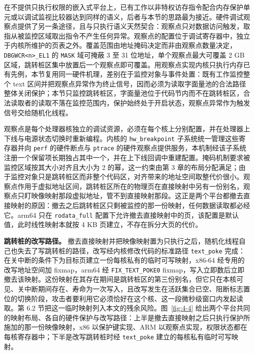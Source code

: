 在不提供只执行权限的嵌入式平台上，已有工作以非特权访存指令配合内存保护单元\citep{kwon2019uxom}或以调试监视比较器\citep{shen2020picoxom}达到同样的语义，后者与本节的思路最为接近。硬件调试观察点提供了另一条途径，且与只执行语义天然契合：观察点只对数据访问触发，取指从被监控区域取出指令不产生任何异常。观察点的配置位于调试寄存器中，独立于内核所维护的页表之外。覆盖范围由地址掩码决定而非由观察点数量决定，\lstinline[breaklines=false]@DBGWCR<n>_EL1@ 的 \lstinline[breaklines=false]@MASK@ 域可掩蔽 3 至 31 位地址，单个观察点最大可覆盖 2 GB 区域，跳转桩区集中放置后一个观察点即可覆盖。用观察点实现内核只执行内存已有先例\citep{jang2019revisiting}，本节复用同一硬件机理，差别在于监控对象与事件处置：既有工作监控整个 text 区间并把观察点异常作为终止信号，因而必须为读取字面量池的合法路径整体关闭保护；本节只监控跳转桩区，字面量池位于代码节内而不在跳转桩区，合法读取者的读取不落在监控范围内，保护始终处于开启状态，观察点异常作为触发信号交给随机化线程。

观察点是每个处理器核独立的调试资源，必须在每个核上分别配置，并在处理器上下线与电源状态切换时重新编程。内核的 \lstinline[breaklines=false]@hw_breakpoint@ 子系统统一管理这些寄存器并向 \lstinline[breaklines=false]@perf@ 的硬件断点与 \lstinline[breaklines=false]@ptrace@ 的硬件观察点提供服务，本机制经该子系统注册一个保留项长期独占其中一个，并在上下线回调中重建配置。掩码机制要求被监控区域按其大小对齐且大小为 2 的幂，这一约束由第 3 章的布局分配满足；由于监控对象只是跳转桩区而非整个代码区，对齐带来的地址空间取整代价很小。观察点作用于虚拟地址区间，跳转桩区所在的物理页在直接映射中另有一份别名，观察点只盯映像映射那段虚拟地址，管不到直接映射那段。这正是两个平台都撤去直接映射的原因：撤去之后跳转桩区只剩被监控的那一份映射，任何数据读取都必经它。arm64 只在 \lstinline[breaklines=false]@rodata_full@ 配置下允许撤去直接映射中的页，该配置是默认值，此时线性映射本就按 4 KB 页建立，不存在拆分大页的代价。

\textbf{跳转桩的改写路径。} 撤去直接映射并把映像映射置为只执行之后，随机化线程自己也失去了写跳转桩的路径，改写经内核修改代码的标准路径 \lstinline[breaklines=false]@text_poke@ 完成：在关中断的条件下为目标页建立一份每核私有的临时可写映射，x86-64 经专用的改写地址空间加 fixmap，arm64 经 \lstinline[breaklines=false]@FIX_TEXT_POKE0@ fixmap，写入立即数后立即撤去该映射。这份映射在其存在期间是跳转桩区的第三份别名，但它只在本核可见、关中断期间存在、寿命为一次写入，且改写发生在活跃集合已空、阻断标志置位的切换阶段，攻击者要利用它必须恰好在这个核、这一段微秒级窗口内发起读取。第 6.2 节把这一临时映射列入本文的残余风险。图~\ref{fig:4-4} 给出两个平台共同的映射布局、各自的硬件保护与改写路径：上半是撤去直接映射之后只执行保护所施加的那一份映像映射，x86 以保护键实现、ARM 以观察点实现，权限状态都在每核寄存器中；下半是改写跳转桩时经 \lstinline[breaklines=false]@text_poke@ 建立的每核私有临时可写映射。

